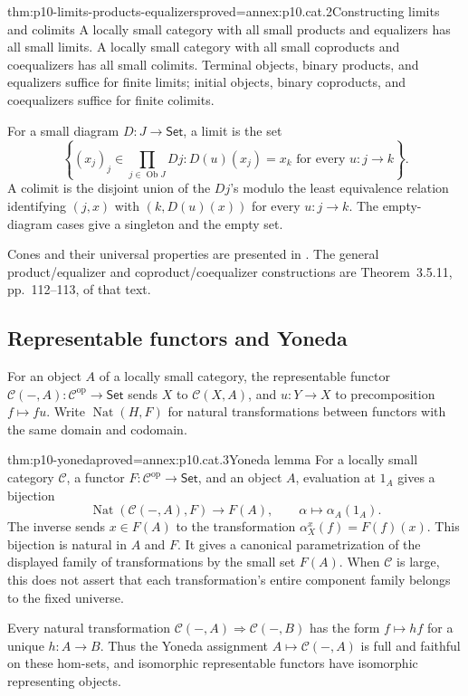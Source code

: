\begin{hbtheorem}{thm:p10-limits-products-equalizers}{proved=annex:p10.cat.2}{Constructing limits and colimits}
A locally small category with all small products and equalizers
has all small limits.  A locally small category with all small
coproducts and coequalizers has all small colimits.
Terminal objects, binary products, and equalizers suffice for
finite limits; initial objects, binary coproducts, and
coequalizers suffice for finite colimits.

For a small diagram \(D:J\to\mathsf{Set}\), a limit is the set
\[
 \left\{(x_j)_j\in\prod_{j\in\operatorname{Ob}J}D j:
       D(u)(x_j)=x_k\text{ for every }u:j\to k\right\}.
\]
A colimit is the disjoint union of the \(D j\)'s modulo the least
equivalence relation identifying
\((j,x)\) with \((k,D(u)(x))\) for every \(u:j\to k\).
The empty-diagram cases give a singleton and the empty set.
\end{hbtheorem}

Cones and their universal properties are presented in
\cite[Section~3.1, Definitions~3.1.1--3.1.6 and
Proposition~3.1.7]{Riehl2026ContextOnline}.
The general product/equalizer and coproduct/coequalizer
constructions are Theorem~3.5.11, pp.~112--113, of that text.

\subsection{Representable functors and Yoneda}

For an object \(A\) of a locally small category, the representable
functor \(\mathcal C(-,A):\mathcal C^{\mathrm{op}}\to\mathsf{Set}\)
sends \(X\) to \(\mathcal C(X,A)\), and \(u:Y\to X\) to
precomposition \(f\mapsto f u\).
Write \(\operatorname{Nat}(H,F)\) for natural transformations
between functors with the same domain and codomain.

\begin{hbtheorem}{thm:p10-yoneda}{proved=annex:p10.cat.3}{Yoneda lemma}
For a locally small category \(\mathcal C\), a functor
\(F:\mathcal C^{\mathrm{op}}\to\mathsf{Set}\), and an object \(A\),
evaluation at \(1_A\) gives a bijection
\[
 \operatorname{Nat}(\mathcal C(-,A),F)\longrightarrow F(A),
 \qquad \alpha\longmapsto\alpha_A(1_A).
\]
The inverse sends \(x\in F(A)\) to the transformation
\(\alpha^x_X(f)=F(f)(x)\).
This bijection is natural in \(A\) and \(F\).
It gives a canonical parametrization of the displayed family of
transformations by the small set \(F(A)\).
When \(\mathcal C\) is large, this does not assert that each
transformation's entire component family belongs to the fixed
universe.

Every natural transformation
\(\mathcal C(-,A)\Rightarrow\mathcal C(-,B)\) has the form
\(f\mapsto h f\) for a unique \(h:A\to B\).
Thus the Yoneda assignment \(A\mapsto\mathcal C(-,A)\) is full
and faithful on these hom-sets, and isomorphic representable
functors have isomorphic representing objects.
\end{hbtheorem}

